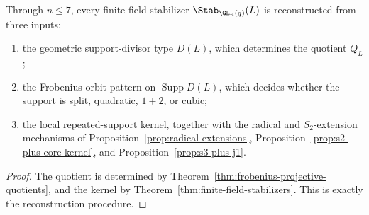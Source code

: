 \begin{corollary}[Reconstruction]
\label{cor:finite-field-reconstruction}
Through \(n\leq 7\), every finite-field stabilizer \(\Stab_{\GL_n(q)}(L)\) is
reconstructed from three inputs:
\begin{enumerate}[label=\arabic*.]
\item the geometric support-divisor type \(D(L)\), which determines the
  quotient \(Q_L\);
\item the Frobenius orbit pattern on \(\operatorname{Supp} D(L)\), which
  decides whether the support is split, quadratic, \(1+2\), or cubic;
\item the local repeated-support kernel, together with the radical and
  \(S_2\)-extension mechanisms of Proposition~\ref{prop:radical-extensions},
  Proposition~\ref{prop:s2-plus-core-kernel}, and
  Proposition~\ref{prop:s3-plus-j1}.
\end{enumerate}
\end{corollary}

\begin{proof}
The quotient is determined by
Theorem~\ref{thm:frobenius-projective-quotients}, and the kernel by
Theorem~\ref{thm:finite-field-stabilizers}. This is exactly the reconstruction
procedure.
\end{proof}
